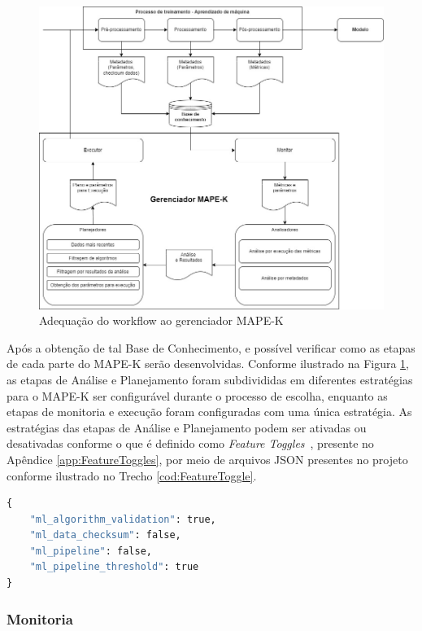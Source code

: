 \documentclass[portugues]{ic-tese}
\begin{document}
\begin{figure}[H]
\centering
\includegraphics[scale=0.5]{images/ML-MAPE-K.jpg}
\caption {Adequação do workflow ao gerenciador MAPE-K}
\label{fig:MLMAPEK}
\end{figure}

Após a obtenção de tal Base de Conhecimento, e possível verificar como as etapas de cada parte do MAPE-K serão desenvolvidas. Conforme ilustrado na Figura \ref{fig:MLMAPEK}, as etapas de Análise e Planejamento foram subdivididas em diferentes estratégias para o MAPE-K ser configurável durante o processo de escolha, enquanto as etapas de monitoria e execução foram configuradas com uma única estratégia. As estratégias das etapas de Análise e Planejamento podem ser ativadas ou desativadas conforme o que é definido como \textit{Feature Toggles}~\citep{Rahman_2016}, presente no Apêndice \ref{app:FeatureToggles}, por meio de arquivos JSON presentes no projeto conforme ilustrado no Trecho \ref{cod:FeatureToggle}.

\begin{lstlisting}[language=Python, caption=Exemplo de arquivo utilizando \textbf{(ver termo acima)},label=cod:FeatureToggle]
{
	"ml_algorithm_validation": true,
	"ml_data_checksum": false,
	"ml_pipeline": false,
	"ml_pipeline_threshold": true	
}
\end{lstlisting}

\subsubsection{Monitoria}
\end{document}
